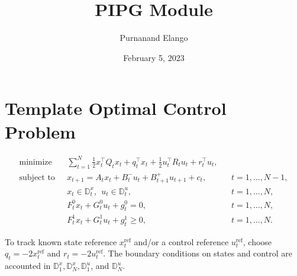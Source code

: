 \documentclass[letterpaper,11pt]{article}
\title{PIPG Module}
\author{Purnanand Elango}
\date{February 5, 2023}
\begin{document}
\maketitle 

\section{Template Optimal Control Problem}

\begin{subequations}
\begin{align}
    \operatorname{minimize}~~&~\sum_{t=1}^N \frac{1}{2}x_t^\top Q_t x_t +q_t^\top x_t + \frac{1}{2}u_t^\top R_t u_t + r_t^\top u_t,\\
    \operatorname{subject~to}~~&~x_{t+1} = A_t x_t + B_t^{-}u_t + B_{t+1}^+u_{t+1} + c_t, & & t = 1,\ldots,N-1,\\
    &~x_t\in\mathbb{D}^x_t,~~u_t \in \mathbb{D}^u_t, & & t = 1, \ldots, N,\label{eq:x-u-proj-cnstr}\\
    &~F^0_t x_t + G^0_t u_t + g^0_t = 0, & & t = 1, \ldots, N,\label{eq:x-u-zerocone}\\
    &~F^1_t x_t + G^1_t u_t + g^1_t \ge 0, & & t = 1, \ldots, N.\label{eq:x-u-orthcone} 
\end{align}\label{prb:template-ocp}%
\end{subequations}


To track known state reference $x_t^{\text{ref}}$ and/or a control reference $u^{\text{ref}}_t$, choose $q_t = -2x_t^{\text{ref}}$ and $r_t = -2u^{\text{ref}}_t$. The boundary conditions on states and control are accounted in $\mathbb{D}^x_1,\mathbb{D}^x_N,\mathbb{D}^u_1$, and $\mathbb{D}^u_N$.
\end{document}
